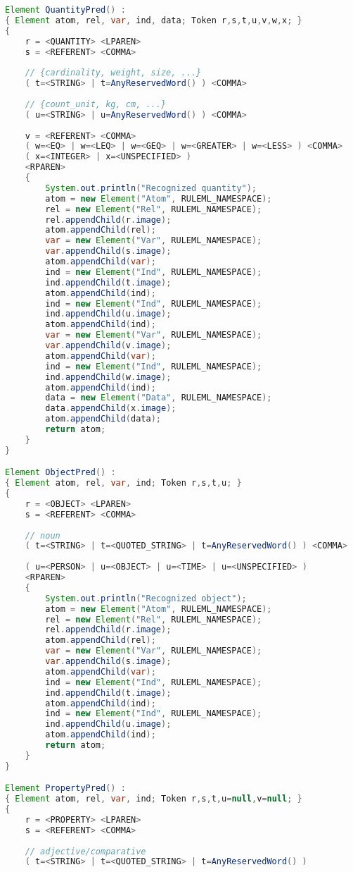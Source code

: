 \documentclass[12pt]{report}
\begin{document}
\begin{lstlisting}[language=java, showstringspaces=false, tabsize=2]
Element QuantityPred() :
{ Element atom, rel, var, ind, data; Token r,s,t,u,v,w,x; }
{
	r = <QUANTITY> <LPAREN>
	s = <REFERENT> <COMMA>
	
	// {cardinality, weight, size, ...}
	( t=<STRING> | t=AnyReservedWord() ) <COMMA>
	
	// {count_unit, kg, cm, ...}
	( u=<STRING> | u=AnyReservedWord() ) <COMMA>
	
	v = <REFERENT> <COMMA>
	( w=<EQ> | w=<LEQ> | w=<GEQ> | w=<GREATER> | w=<LESS> ) <COMMA>
	( x=<INTEGER> | x=<UNSPECIFIED> )
	<RPAREN>
	{
		System.out.println("Recognized quantity");
		atom = new Element("Atom", RULEML_NAMESPACE);
		rel = new Element("Rel", RULEML_NAMESPACE);
		rel.appendChild(r.image);
		atom.appendChild(rel);
		var = new Element("Var", RULEML_NAMESPACE);
		var.appendChild(s.image);
		atom.appendChild(var);
		ind = new Element("Ind", RULEML_NAMESPACE);
		ind.appendChild(t.image);
		atom.appendChild(ind);
		ind = new Element("Ind", RULEML_NAMESPACE);
		ind.appendChild(u.image);
		atom.appendChild(ind);
		var = new Element("Var", RULEML_NAMESPACE);
		var.appendChild(v.image);
		atom.appendChild(var);
		ind = new Element("Ind", RULEML_NAMESPACE);
		ind.appendChild(w.image);
		atom.appendChild(ind);
		data = new Element("Data", RULEML_NAMESPACE);
		data.appendChild(x.image);
		atom.appendChild(data);
		return atom;
	}
}

Element ObjectPred() :
{ Element atom, rel, var, ind; Token r,s,t,u; }
{
	r = <OBJECT> <LPAREN>
	s = <REFERENT> <COMMA>
	
	// noun
	( t=<STRING> | t=<QUOTED_STRING> | t=AnyReservedWord() ) <COMMA>
	
	( u=<PERSON> | u=<OBJECT> | u=<TIME> | u=<UNSPECIFIED> )
	<RPAREN>
	{
		System.out.println("Recognized object");
		atom = new Element("Atom", RULEML_NAMESPACE);
		rel = new Element("Rel", RULEML_NAMESPACE);
		rel.appendChild(r.image);
		atom.appendChild(rel);
		var = new Element("Var", RULEML_NAMESPACE);
		var.appendChild(s.image);
		atom.appendChild(var);
		ind = new Element("Ind", RULEML_NAMESPACE);
		ind.appendChild(t.image);
		atom.appendChild(ind);
		ind = new Element("Ind", RULEML_NAMESPACE);
		ind.appendChild(u.image);
		atom.appendChild(ind);
		return atom;
	}
}

Element PropertyPred() :
{ Element atom, rel, var, ind; Token r,s,t,u=null,v=null; }
{
	r = <PROPERTY> <LPAREN>
	s = <REFERENT> <COMMA>
	
	// adjective/comparative
	( t=<STRING> | t=<QUOTED_STRING> | t=AnyReservedWord() )
	

\end{lstlisting}
\end{document}
